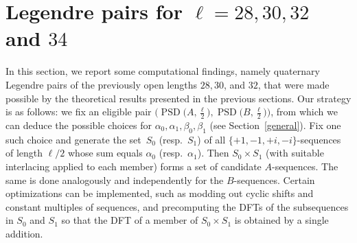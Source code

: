 \documentclass{article}
\theoremstyle{definition}
\newcommand{\DFT}{\operatorname{DFT}}
\newcommand{\PSD}{\operatorname{PSD}}
\begin{document}
%


\section{Legendre pairs for \texorpdfstring{$\ell=28,30,32$ and $34$}{l=28, 30, 32 and 34}}
\label{constructions}

In this section, we report some computational findings, namely quaternary Legendre pairs of the previously open lengths $28,30$, and $32$, that were made possible by the theoretical results presented in the previous sections. Our strategy is as follows: we fix an eligible pair $\bigl(\PSD\bigl(A,\frac{\ell}{2}\bigr),\PSD\bigl(B,\frac{\ell}{2}\bigr)\bigr)$, from which we can deduce the possible choices for $\alpha_0,\alpha_1,\beta_0,\beta_1$ (see Section~\ref{general}). Fix one such choice and generate the set~$S_0$ (resp.~$S_1$) of all $\{+1,-1,+i,-i\}$-sequences of length $\ell/2$ whose sum equals $\alpha_0$ (resp.~$\alpha_1$). Then $S_0\times S_1$ (with suitable interlacing applied to each member) forms a set of candidate $A$-sequences. The same is done analogously and independently for the $B$-sequences. Certain optimizations can be implemented, such as modding out cyclic shifts and constant multiples of sequences, and precomputing the DFTs of the subsequences in $S_0$ and $S_1$ so that the DFT of a member of $S_0\times S_1$ is obtained by a single addition.
\end{document}

